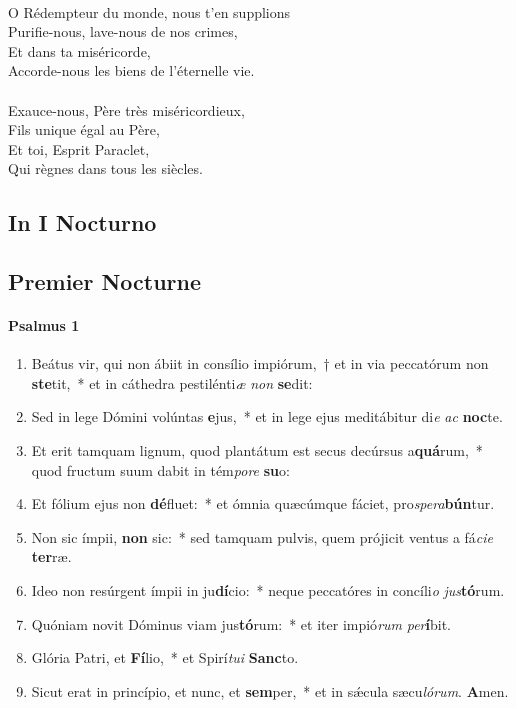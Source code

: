 \documentclass[twoside]{article}
\begin{document}
\begin{paracol}[1]{2}
\\
O Rédempteur du monde, nous t'en supplions\\
Purifie-nous, lave-nous de nos crimes,\\
Et dans ta miséricorde,\\
Accorde-nous les biens de l'éternelle vie.\\
\\
Exauce-nous, Père très miséricordieux,\\
Fils unique égal au Père,\\
Et toi, Esprit Paraclet,\\
Qui règnes dans tous les siècles.
\vfill
\newpage

\switchcolumn*

\subsection{In I Nocturno}

\switchcolumn

\subsection{Premier Nocturne}

\switchcolumn*

\paragraph{Psalmus 1}


\begin{enumerate}[wide, itemsep=0mm, labelwidth=!, labelindent=0pt, label=\color{gregoriocolor}\theenumi]
\item Beátus vir, qui non ábiit in consílio impiórum,~† et in via peccatórum non \textbf{ste}tit,~* et in cáthedra pestilénti\textit{æ} \textit{non} \textbf{se}dit:
\item Sed in lege Dómini volúntas \textbf{e}jus,~* et in lege ejus meditábitur di\textit{e} \textit{ac} \textbf{noc}te.
\item Et erit tamquam lignum, quod plantátum est secus decúrsus a\textbf{quá}rum,~* quod fructum suum dabit in tém\textit{po}\textit{re} \textbf{su}o:
\item Et fólium ejus non \textbf{dé}fluet:~* et ómnia quæcúmque fáciet, pro\textit{spe}\textit{ra}\textbf{bún}tur.
\item Non sic ímpii, \textbf{non} sic:~* sed tamquam pulvis, quem prójicit ventus a fá\textit{ci}\textit{e} \textbf{ter}ræ.
\item Ideo non resúrgent ímpii in ju\textbf{dí}cio:~* neque peccatóres in concíli\textit{o} \textit{jus}\textbf{tó}rum.
\item Quóniam novit Dóminus viam jus\textbf{tó}rum:~* et iter impió\textit{rum} \textit{per}\textbf{í}bit.
\item Glória Patri, et \textbf{Fí}lio,~* et Spirí\textit{tu}\textit{i} \textbf{Sanc}to.
\item Sicut erat in princípio, et nunc, et \textbf{sem}per,~* et in sǽcula sæcu\textit{ló}\textit{rum}. \textbf{A}men.
\end{enumerate}


\end{paracol}
\end{document}

